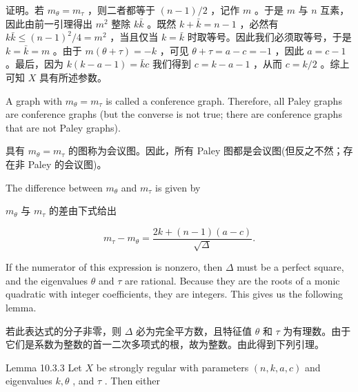 \documentclass[10pt]{article}
\begin{document}
\begin{tcolorbox}\relax
证明。若 \({m}_{\theta } = {m}_{\tau }\) ，则二者都等于 \(\left( {n - 1}\right) /2\) ，记作 \(m\) 。于是 \(m\) 与 \(n\) 互素，因此由前一引理得出 \({m}^{2}\) 整除 \(k\bar{k}\) 。既然 \(k + \bar{k} = n - 1\) ，必然有 \(k\bar{k} \leq  {\left( n - 1\right) }^{2}/4 = {m}^{2}\) ，当且仅当 \(k = \bar{k}\) 时取等号。因此我们必须取等号，于是 \(k = \bar{k} = m\) 。由于 \(m\left( {\theta  + \tau }\right)  =  - k\) ，可见 \(\theta  + \tau  = a - c =  - 1\) ，因此 \(a = c - 1\) 。最后，因为 \(k\left( {k - a - 1}\right)  = \bar{k}c\) 我们得到 \(c = k - a - 1\) ，从而 \(c = k/2\) 。综上可知 \(X\) 具有所述参数。
\end{tcolorbox}

A graph with \({m}_{\theta } = {m}_{\tau }\) is called a conference graph. Therefore, all Paley graphs are conference graphs (but the converse is not true; there are conference graphs that are not Paley graphs).

\begin{tcolorbox}\relax
具有 \({m}_{\theta } = {m}_{\tau }\) 的图称为会议图。因此，所有 Paley 图都是会议图(但反之不然；存在非 Paley 的会议图)。
\end{tcolorbox}

The difference between \({m}_{\theta }\) and \({m}_{\tau }\) is given by

\begin{tcolorbox}\relax
\({m}_{\theta }\) 与 \({m}_{\tau }\) 的差由下式给出
\end{tcolorbox}

\[
{m}_{\tau } - {m}_{\theta } = \frac{{2k} + \left( {n - 1}\right) \left( {a - c}\right) }{\sqrt{\Delta }}.
\]

If the numerator of this expression is nonzero, then \(\Delta\) must be a perfect square, and the eigenvalues \(\theta\) and \(\tau\) are rational. Because they are the roots of a monic quadratic with integer coefficients, they are integers. This gives us the following lemma.

\begin{tcolorbox}\relax
若此表达式的分子非零，则 \(\Delta\) 必为完全平方数，且特征值 \(\theta\) 和 \(\tau\) 为有理数。由于它们是系数为整数的首一二次多项式的根，故为整数。由此得到下列引理。
\end{tcolorbox}

Lemma 10.3.3 Let \(X\) be strongly regular with parameters \(\left( {n,k,a,c}\right)\) and eigenvalues \(k,\theta\) , and \(\tau\) . Then either
\end{document}
